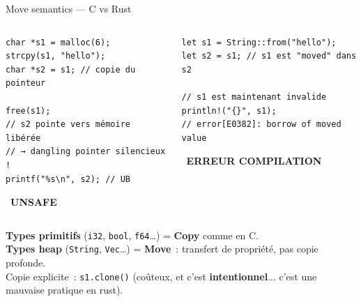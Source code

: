 \documentclass[aspectratio=169, 10pt]{beamer}
\newcommand{\rust}[1]{\texttt{#1}}
\newcommand{\unsafe}{{\color{DangerRed}\faTimesCircle\ \textbf{UNSAFE}}}
\newcommand{\compilerr}{{\color{DangerRed}\faTimesCircle\ \textbf{ERREUR COMPILATION}}}
\begin{document}
\begin{frame}[fragile]{Move semantics --- C vs Rust}
  \begin{columns}[t]
    \begin{tcolorbox}[dangerbox, title={C --- deux pointeurs}]
      \begin{verbatim}
char *s1 = malloc(6);
strcpy(s1, "hello");
char *s2 = s1; // copie du pointeur

free(s1);
// s2 pointe vers mémoire libérée
// → dangling pointer silencieux !
printf("%s\n", s2); // UB
      \end{verbatim}
    \unsafe
    \end{tcolorbox}

    \begin{tcolorbox}[safebox, title={\faRust\ Rust --- move interdit de réutiliser}]
      \begin{verbatim}
let s1 = String::from("hello");
let s2 = s1; // s1 est "moved" dans s2

// s1 est maintenant invalide
println!("{}", s1);
// error[E0382]: borrow of moved value
      \end{verbatim}
    \compilerr
    \end{tcolorbox}
  \end{columns}
  \begin{tcolorbox}[notebox, title={\faLightbulb\ Copy vs Move}]
    \small
    \textbf{Types primitifs} (\rust{i32}, \rust{bool}, \rust{f64}\ldots) = \textbf{Copy} comme en C.\\
    \textbf{Types heap} (\rust{String}, \rust{Vec}\ldots) = \textbf{Move}~: transfert de propriété, pas copie profonde.\\
    Copie explicite~: \rust{s1.clone()} (coûteux, et c'est \textbf{intentionnel}... c'est une mauvaise pratique en rust).
  \end{tcolorbox}
\end{frame}
\end{document}
